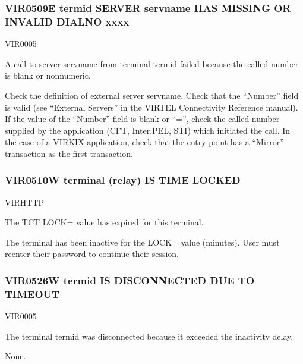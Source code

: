 \documentclass[letterpaper,10pt,english]{sphinxmanual}
\begin{document}
\subsubsection{VIR0509E termid SERVER servname HAS MISSING OR INVALID DIALNO xxxx}
\label{\detokenize{messages:vir0509e-termid-server-servname-has-missing-or-invalid-dialno-xxxx}}\begin{description}
\sphinxAtStartPar
VIR0005

\sphinxAtStartPar
A call to server servname from terminal termid failed because the called number is blank or non\sphinxhyphen{}numeric.

\sphinxAtStartPar
Check the definition of external server servname. Check that the “Number” field is valid (see “External Servers” in the VIRTEL Connectivity Reference manual). If the value of the “Number” field is blank or “=”, check the called number supplied by the application (CFT, Inter.PEL, STI) which initiated the call. In the case of a VIRKIX application, check that the entry point has a “Mirror” transaction as the first transaction.

\end{description}


\subsubsection{VIR0510W terminal (relay) IS TIME LOCKED}
\label{\detokenize{messages:vir0510w-terminal-relay-is-time-locked}}\begin{description}
\sphinxAtStartPar
VIRHTTP

\sphinxAtStartPar
The TCT LOCK= value has expired for this terminal.

\sphinxAtStartPar
The terminal has been inactive for the LOCK= value (minutes). User must re\sphinxhyphen{}enter their password to continue their session.

\end{description}


\subsubsection{VIR0526W termid IS DISCONNECTED DUE TO TIME\sphinxhyphen{}OUT}
\label{\detokenize{messages:vir0526w-termid-is-disconnected-due-to-time-out}}\begin{description}
\sphinxAtStartPar
VIR0005

\sphinxAtStartPar
The terminal termid was disconnected because it exceeded the inactivity delay.

\sphinxAtStartPar
None.

\end{description}
\end{document}
